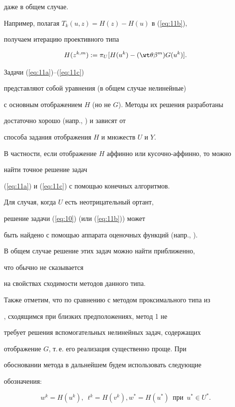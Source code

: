 даже в общем случае.


Например, полагая $ T_{k}(u,z)=H(z)-H(u)$ в (\ref{eq:11b}), 


получаем итерацию проективного типа


\begin{equation} \label{eq:11c} 


H(z^{k,m}):=\pi_{U} [ H(u^{k}) -(\wt \theta \beta ^{m}) G(u^{k})].


\end{equation}


Задачи (\ref{eq:11a})--(\ref{eq:11c})


представляют собой уравнения (в общем случае нелинейные)


с основным отображением $H$ (но не $G$). Методы их решения разработаны 


достаточно хорошо (напр., \cite{ОР75}) и зависят от


способа задания отображения $H$ и множеств $U$ и $Y$.


В частности, если отображение $H$ аффинно или кусочно-аффинно, то можно


найти точное решение задач


(\ref{eq:11a}) и (\ref{eq:11c}) с помощью конечных алгоритмов.


Для случая, когда $U$ есть неотрицательный ортант,


решение задачи (\ref{eq:10}) (или (\ref{eq:11b})) может 


быть найдено с помощью аппарата оценочных функций (напр., \cite{KF96}).


В общем случае решение этих задач можно найти приближенно, 


что обычно не сказывается


на свойствах сходимости методов данного типа.





Также отметим, что по сравнению с методом проксимального типа из 


\cite{He99}, сходящимся при близких предположениях, метод 1 не 


требует решения вспомогательных нелинейных задач, содержащих 


отображение $G$, т.\,е. его реализация существенно проще. При 


обосновании метода в дальнейшем будем использовать следующие 


обозначения:


\begin{equation} \label{eq:12}


w^{k}=H(u^{k}),\ \; t^{k}=H(v^{k}), 


w^{*}=H(u^{*})\ \; \text{при}\ \; u^{*} \in U^{*}. 


\end{equation}





